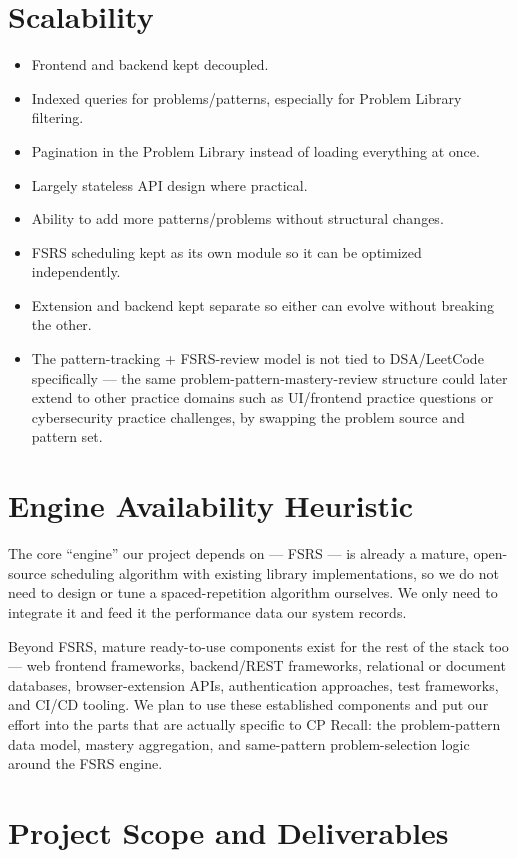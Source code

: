 \documentclass[11pt,a4paper]{article}
\begin{document}
\section{Scalability}
\begin{itemize}[leftmargin=0.7cm]
\item Frontend and backend kept decoupled.
\item Indexed queries for problems/patterns, especially for Problem Library filtering.
\item Pagination in the Problem Library instead of loading everything at once.
\item Largely stateless API design where practical.
\item Ability to add more patterns/problems without structural changes.
\item FSRS scheduling kept as its own module so it can be optimized independently.
\item Extension and backend kept separate so either can evolve without breaking the other.
\item The pattern-tracking + FSRS-review model is not tied to DSA/LeetCode specifically --- the same problem-pattern-mastery-review structure could later extend to other practice domains such as UI/frontend practice questions or cybersecurity practice challenges, by swapping the problem source and pattern set.
\end{itemize}

\section{Engine Availability Heuristic}
The core ``engine'' our project depends on --- FSRS --- is already a mature, open-source scheduling algorithm with existing library implementations, so we do not need to design or tune a spaced-repetition algorithm ourselves. We only need to integrate it and feed it the performance data our system records.

Beyond FSRS, mature ready-to-use components exist for the rest of the stack too --- web frontend frameworks, backend/REST frameworks, relational or document databases, browser-extension APIs, authentication approaches, test frameworks, and CI/CD tooling. We plan to use these established components and put our effort into the parts that are actually specific to CP Recall: the problem-pattern data model, mastery aggregation, and same-pattern problem-selection logic around the FSRS engine.

\section{Project Scope and Deliverables}
\end{document}
